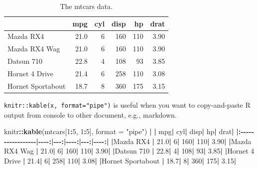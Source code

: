 \documentclass[
  a4paper,
  twoside,
  openright]{book}
\newenvironment{Shaded}{\begin{snugshade}}{\end{snugshade}}
\newcommand{\AttributeTok}[1]{\textcolor[rgb]{0.13,0.29,0.53}{#1}}
\newcommand{\DecValTok}[1]{\textcolor[rgb]{0.00,0.00,0.81}{#1}}
\newcommand{\ErrorTok}[1]{\textcolor[rgb]{0.64,0.00,0.00}{\textbf{#1}}}
\newcommand{\FloatTok}[1]{\textcolor[rgb]{0.00,0.00,0.81}{#1}}
\newcommand{\FunctionTok}[1]{\textcolor[rgb]{0.13,0.29,0.53}{\textbf{#1}}}
\newcommand{\NormalTok}[1]{#1}
\newcommand{\SpecialCharTok}[1]{\textcolor[rgb]{0.81,0.36,0.00}{\textbf{#1}}}
\newcommand{\StringTok}[1]{\textcolor[rgb]{0.31,0.60,0.02}{#1}}
\theoremstyle{definition}
\theoremstyle{definition}
\theoremstyle{definition}
\theoremstyle{definition}
\theoremstyle{remark}
\begin{document}
\begin{table}

\caption{\label{tab:mtcars}The mtcars data.}
\centering
\begin{tabular}[t]{l|r|r|r|r|r}
\hline
  & mpg & cyl & disp & hp & drat\\
\hline
Mazda RX4 & 21.0 & 6 & 160 & 110 & 3.90\\
\hline
Mazda RX4 Wag & 21.0 & 6 & 160 & 110 & 3.90\\
\hline
Datsun 710 & 22.8 & 4 & 108 & 93 & 3.85\\
\hline
Hornet 4 Drive & 21.4 & 6 & 258 & 110 & 3.08\\
\hline
Hornet Sportabout & 18.7 & 8 & 360 & 175 & 3.15\\
\hline
\end{tabular}
\end{table}

\texttt{knitr::kable(x,\ format="pipe")} is useful when you want to copy-and-paste R output from console to other document, e.g., markdown.

\begin{Shaded}
\begin{Highlighting}[]
\NormalTok{knitr}\SpecialCharTok{::}\FunctionTok{kable}\NormalTok{(mtcars[}\DecValTok{1}\SpecialCharTok{:}\DecValTok{5}\NormalTok{, }\DecValTok{1}\SpecialCharTok{:}\DecValTok{5}\NormalTok{], }\AttributeTok{format =} \StringTok{"pipe"}\NormalTok{)}
\SpecialCharTok{|}                  \ErrorTok{|}\NormalTok{  mpg}\SpecialCharTok{|}\NormalTok{ cyl}\SpecialCharTok{|}\NormalTok{ disp}\SpecialCharTok{|}\NormalTok{  hp}\SpecialCharTok{|}\NormalTok{ drat}\SpecialCharTok{|}
\ErrorTok{|:}\SpecialCharTok{{-}{-}{-}{-}{-}{-}{-}{-}{-}{-}{-}{-}{-}{-}{-}{-}{-}}\ErrorTok{|}\SpecialCharTok{{-}{-}{-}{-}}\ErrorTok{:|}\SpecialCharTok{{-}{-}{-}}\ErrorTok{:|}\SpecialCharTok{{-}{-}{-}{-}}\ErrorTok{:|}\SpecialCharTok{{-}{-}{-}}\ErrorTok{:|}\SpecialCharTok{{-}{-}{-}{-}}\ErrorTok{:|}
\ErrorTok{|}\NormalTok{Mazda RX4         }\SpecialCharTok{|} \FloatTok{21.0}\SpecialCharTok{|}   \DecValTok{6}\SpecialCharTok{|}  \DecValTok{160}\SpecialCharTok{|} \DecValTok{110}\SpecialCharTok{|} \FloatTok{3.90}\SpecialCharTok{|}
\ErrorTok{|}\NormalTok{Mazda RX4 Wag     }\SpecialCharTok{|} \FloatTok{21.0}\SpecialCharTok{|}   \DecValTok{6}\SpecialCharTok{|}  \DecValTok{160}\SpecialCharTok{|} \DecValTok{110}\SpecialCharTok{|} \FloatTok{3.90}\SpecialCharTok{|}
\ErrorTok{|}\NormalTok{Datsun }\DecValTok{710}        \SpecialCharTok{|} \FloatTok{22.8}\SpecialCharTok{|}   \DecValTok{4}\SpecialCharTok{|}  \DecValTok{108}\SpecialCharTok{|}  \DecValTok{93}\SpecialCharTok{|} \FloatTok{3.85}\SpecialCharTok{|}
\ErrorTok{|}\NormalTok{Hornet }\DecValTok{4}\NormalTok{ Drive    }\SpecialCharTok{|} \FloatTok{21.4}\SpecialCharTok{|}   \DecValTok{6}\SpecialCharTok{|}  \DecValTok{258}\SpecialCharTok{|} \DecValTok{110}\SpecialCharTok{|} \FloatTok{3.08}\SpecialCharTok{|}
\ErrorTok{|}\NormalTok{Hornet Sportabout }\SpecialCharTok{|} \FloatTok{18.7}\SpecialCharTok{|}   \DecValTok{8}\SpecialCharTok{|}  \DecValTok{360}\SpecialCharTok{|} \DecValTok{175}\SpecialCharTok{|} \FloatTok{3.15}\SpecialCharTok{|}
\end{Highlighting}
\end{Shaded}
\end{document}
